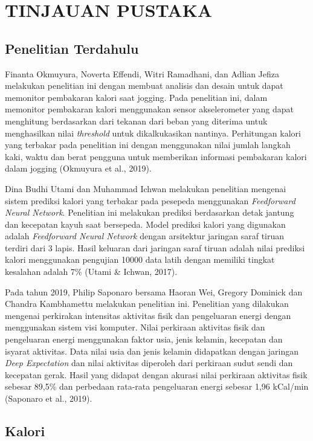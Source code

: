 \chapter{TINJAUAN PUSTAKA}
\label{chap:tinjauanpustaka}

\section{Penelitian Terdahulu}
\label{sec:penelitianterdahulu}

Finanta Okmuyura, Noverta Effendi, Witri Ramadhani, dan Adlian Jefiza melakukan penelitian ini dengan membuat analisis dan desain untuk dapat memonitor pembakaran kalori saat jogging. Pada penelitian ini, dalam memonitor pembakaran kalori menggunakan sensor akselerometer yang dapat menghitung berdasarkan dari tekanan dari beban yang diterima untuk menghasilkan nilai \emph{threshold} untuk dikalkukasikan nantinya. Perhitungan kalori yang terbakar pada penelitian ini dengan menggunakan nilai jumlah langkah kaki, waktu dan berat pengguna untuk memberikan informasi pembakaran kalori dalam jogging (Okmuyura et al., 2019).

Dina Budhi Utami dan Muhammad Ichwan melakukan penelitian mengenai sistem prediksi kalori yang terbakar pada pesepeda menggunakan \emph{Feedforward Neural Network}. Penelitian ini melakukan prediksi berdasarkan detak jantung dan kecepatan kayuh saat bersepeda. Model prediksi kalori yang digunakan adalah \emph{Feedforward Neural Network} dengan arsitektur jaringan saraf tiruan terdiri dari 3 lapis. Hasil keluaran dari jaringan saraf tiruan adalah nilai prediksi kalori menggunakan pengujian 10000 data latih dengan memiliki tingkat kesalahan adalah 7\% (Utami \& Ichwan, 2017).

Pada tahun 2019, Philip Saponaro bersama Haoran Wei, Gregory Dominick dan Chandra Kambhamettu melakukan penelitian ini. Penelitian yang dilakukan mengenai perkirakan intensitas aktivitas fisik dan pengeluaran energi dengan menggunakan sistem visi komputer. Nilai perkiraan aktivitas fisik dan pengeluaran energi menggunakan faktor usia, jenis kelamin, kecepatan dan isyarat aktivitas. Data nilai usia dan jenis kelamin didapatkan dengan jaringan \emph{Deep Expectation} dan nilai aktivitas diperoleh dari perkiraan sudut sendi dan kecepatan gerak. Hasil yang didapat dengan akurasi nilai perkiraan aktivitas fisik sebesar 89,5\% dan perbedaan rata-rata pengeluaran energi sebesar 1,96 kCal/min (Saponaro et al.,  2019).


\section{Kalori}
\label{sec:kalori}


